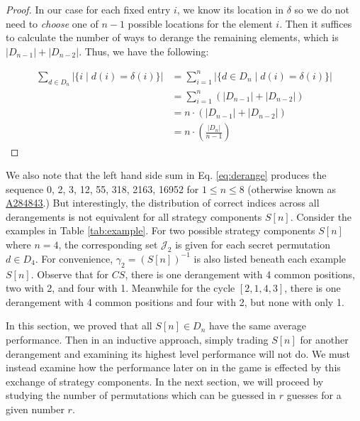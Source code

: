 \documentclass[article]{amsart}
\theoremstyle{definition}
\theoremstyle{definition}
\theoremstyle{remark}
\newcommand{\oeis}[1]{\href{https://oeis.org/#1}{\rm  \underline{#1}}}
\begin{document}
\begin{proof}
In our case for each fixed entry $i$, we know its location in $\delta$ so we do not need to \textit{choose} one of $n-1$ possible locations for the element $i$. Then it suffices to calculate the number of ways to derange the remaining elements, which is $|D_{n-1}| + |D_{n-2}|$. Thus, we have the following:

\begin{align*}
    \sum_{d \in D_n} \left| \{ i \mid d(i) = \delta(i) \} \right|
    &= \sum_{i=1}^n \left| \{ d \in D_n \mid d(i) = \delta(i) \} \right| \\
    &= \sum_{i=1}^n (|D_{n-1}| + |D_{n-2}|) \\ 
    &= n \cdot (|D_{n-1}| + |D_{n-2}|) \\ 
    &= n \cdot \left( \frac{|D_n|}{n-1} \right) 
\end{align*}
    
\end{proof}

We also note that the left hand side sum in Eq. \ref{eq:derange} produces the sequence 0, 2, 3, 12, 55, 318, 2163, 16952 for $1 \leq n \leq 8$ (otherwise known as \oeis{A284843}.) But interestingly, the distribution of correct indices across all derangements is not equivalent for all strategy components $S[n]$. Consider the examples in Table \ref{tab:example}. For two possible strategy components $S[n]$ where $n=4$, the corresponding set $\mathcal{J}_2$ is given for each secret permutation $d \in D_4$. For convenience, $\gamma_2 = (S[n])^{-1}$ is also listed beneath each example $S[n]$. Observe that for $CS$, there is one derangement with 4 common positions, two with 2, and four with 1. Meanwhile for the cycle $[2,1,4,3]$, there is one derangement with 4 common positions and four with 2, but none with only 1. 

In this section, we proved that all $S[n] \in D_n$ have the same average performance. Then in an inductive approach, simply trading $S[n]$ for another derangement and examining its highest level performance will not do. We must instead examine how the performance later on in the game is effected by this exchange of strategy components. In the next section, we will proceed by studying the number of permutations which can be guessed in $r$ guesses for a given number $r$.
\end{document}

